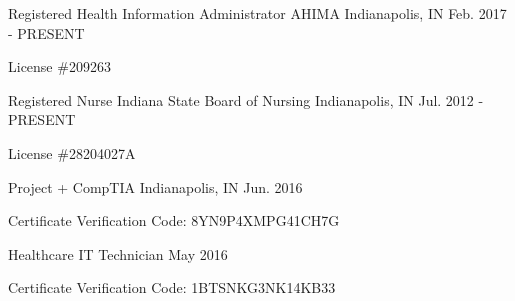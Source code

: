 

\begin{cventries}

  \cventry
    {Registered Health Information Administrator} %
    {AHIMA} %
    {Indianapolis, IN} %
    {Feb. 2017 - PRESENT} %
    {
      \begin{cvitems} %
        \item {License \#209263}
      \end{cvitems}
    }

  \cventry
    {Registered Nurse} %
    {Indiana State Board of Nursing} %
    {Indianapolis, IN} %
    {Jul. 2012 - PRESENT} %
    {
      \begin{cvitems} %
      \item {License \#28204027A}
      \end{cvitems}
    }

  \cventry
    {Project +} %
    {CompTIA} %
    {Indianapolis, IN} %
    {Jun. 2016} %
    {
      \begin{cvitems} %
      \item {Certificate Verification Code: 8YN9P4XMPG41CH7G}
      \end{cvitems}
    }

  \cventry
    {Healthcare IT Technician} %
    {} %
    {} %
    {May 2016} %
    {
      \begin{cvitems} %
      \item {Certificate Verification Code: 1BTSNKG3NK14KB33}
      \end{cvitems}
    }

%
\end{cventries}
